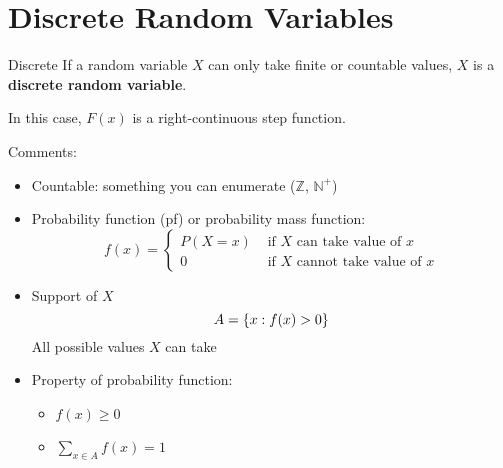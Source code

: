 \section{Discrete Random Variables}
\begin{Definition}{Discrete}{}
    If a random variable $ X $ can only take
    finite or countable values, $ X $
    is a \textbf{discrete random variable}.
\end{Definition}
In this case, $ F(x) $ is a right-continuous
step function.

Comments:
\begin{itemize}
    \item Countable: something you can enumerate ($ \mathbb{Z} $,
          $ \mathbb{N}^+ $)
    \item Probability function (pf)
          or probability mass function:
          \[ f(x)=
              \begin{cases}
                  P(X=x) & \text{ if } X\text{ can take value of }x    \\
                  0      & \text{ if } X\text{ cannot take value of }x
              \end{cases} \]
    \item Support of $ X $
          \[ A=\{x:f(x)>0\} \]
          All possible values $ X $ can take
    \item Property of probability function:
          \begin{itemize}
              \item $ f(x)\geqslant 0 $
              \item $ \sum\limits_{x\in A}f(x)=1 $
          \end{itemize}
\end{itemize}

